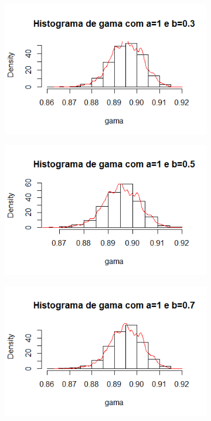 \documentclass{article}
\begin{document}
				\paragraph{}
				\begin{figure}[H]
					\begin{subfigure}[h]{0.6\textwidth}
   						 \includegraphics[width=\textwidth]{a1-0b0-3}
 					 \end{subfigure}
 					 \begin{subfigure}[h]{0.6\textwidth}
   						 \includegraphics[width=\textwidth]{a1-0b0-5}
 					 \end{subfigure}
 					 \begin{subfigure}[h]{0.6\textwidth}
   						 \includegraphics[width=\textwidth]{a1-0b0-7}

\end{subfigure}
\end{figure}
\end{document}
